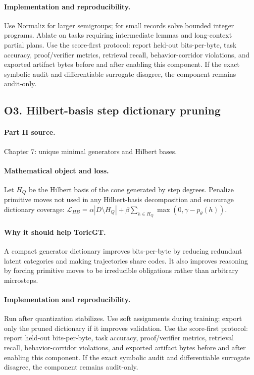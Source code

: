 \documentclass[11pt]{article}
\theoremstyle{definition}
\begin{document}
\paragraph{Implementation and reproducibility.} Use Normaliz for larger semigroups; for small records solve bounded integer programs.  Ablate on tasks requiring intermediate lemmas and long-context partial plans.  Use the score-first protocol: report held-out bits-per-byte, task accuracy, proof/verifier metrics, retrieval recall, behavior-corridor violations, and exported artifact bytes before and after enabling this component.  If the exact symbolic audit and differentiable surrogate disagree, the component remains audit-only.


\subsection{O3. Hilbert-basis step dictionary pruning}
\paragraph{Part II source.} Chapter 7: unique minimal generators and Hilbert bases.
\paragraph{Mathematical object and loss.} Let $H_Q$ be the Hilbert basis of the cone generated by step degrees.  Penalize primitive moves not used in any Hilbert-basis decomposition and encourage dictionary coverage: $\mathcal L_{HB}=\alpha |D\setminus H_Q|+\beta\sum_{h\in H_Q}\max(0,\gamma-p_\theta(h))$.
\paragraph{Why it should help ToricGT.} A compact generator dictionary improves bits-per-byte by reducing redundant latent categories and making trajectories share codes.  It also improves reasoning by forcing primitive moves to be irreducible obligations rather than arbitrary microsteps.
\paragraph{Implementation and reproducibility.} Run after quantization stabilizes.  Use soft assignments during training; export only the pruned dictionary if it improves validation.  Use the score-first protocol: report held-out bits-per-byte, task accuracy, proof/verifier metrics, retrieval recall, behavior-corridor violations, and exported artifact bytes before and after enabling this component.  If the exact symbolic audit and differentiable surrogate disagree, the component remains audit-only.
\end{document}

